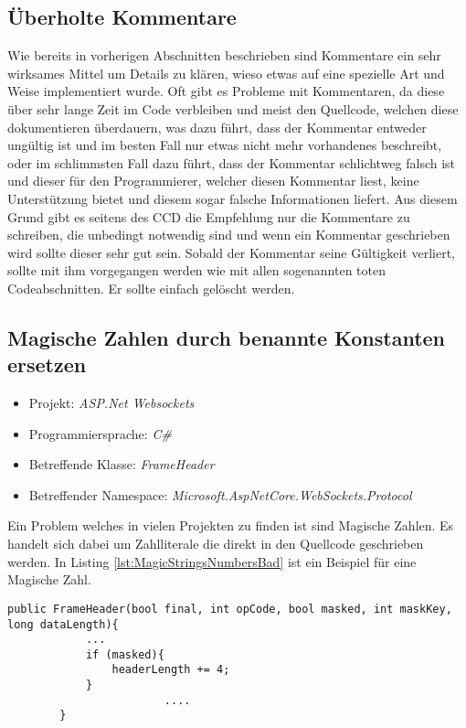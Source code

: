 \subsection{Überholte Kommentare}
\SuperPar Wie bereits in vorherigen Abschnitten beschrieben sind Kommentare ein sehr wirksames Mittel um Details zu klären, wieso etwas auf eine spezielle Art und Weise implementiert wurde. Oft gibt es Probleme mit Kommentaren, da diese über sehr lange Zeit im Code verbleiben und meist den Quellcode, welchen diese dokumentieren überdauern, was dazu führt, dass der Kommentar entweder ungültig ist und im besten Fall nur etwas nicht mehr vorhandenes beschreibt, oder im schlimmsten Fall dazu führt, dass der Kommentar schlichtweg falsch ist und dieser für den Programmierer, welcher diesen Kommentar liest, keine Unterstützung bietet und diesem sogar falsche Informationen liefert. Aus diesem Grund gibt es seitens des CCD die Empfehlung nur die Kommentare zu schreiben, die unbedingt notwendig sind und wenn ein Kommentar geschrieben wird sollte dieser sehr gut sein. Sobald der Kommentar seine Gültigkeit verliert, sollte mit ihm vorgegangen werden wie mit allen sogenannten toten Codeabschnitten. Er sollte einfach gelöscht werden. 

\subsection{Magische Zahlen durch benannte Konstanten ersetzen}
\begin{itemize}
	\item Projekt: \textit{ASP.Net Websockets}
	\item Programmiersprache: \textit{C\#}
	\item Betreffende Klasse: \textit{FrameHeader}
	\item Betreffender Namespace: \textit{Microsoft.AspNetCore.WebSockets.Protocol}
\end{itemize}

\SuperPar Ein Problem welches in vielen Projekten zu finden ist sind Magische Zahlen. Es handelt sich dabei um Zahlliterale die direkt in den Quellcode geschrieben werden. In Listing \ref{lst:MagicStringsNumbersBad} ist ein Beispiel für eine Magische Zahl.

\begin{lstlisting}[language={[Sharp]C}, caption=MagicNumbers, label=lst:MagicStringsNumbersBad]
        public FrameHeader(bool final, int opCode, bool masked, int maskKey, long dataLength){
           	...
            if (masked){
                headerLength += 4;
            }
						....
        }
\end{lstlisting}

